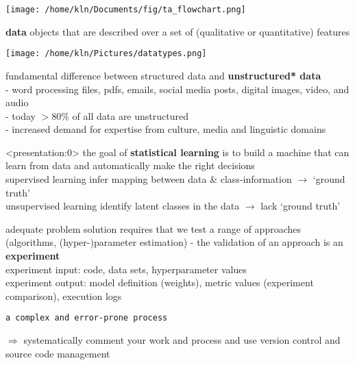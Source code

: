 \documentclass[8pt]{beamer}
\begin{document}
\begin{frame}
	\begin{center}
		\texttt{[image: /home/kln/Documents/fig/ta\_flowchart.png]}
	\end{center}
\end{frame}


\begin{frame}{}
\textbf{data} objects that are described over a set of (qualitative or quantitative) features 
\medskip
	\begin{center}
		\texttt{[image: /home/kln/Pictures/datatypes.png]}
	\end{center}
\medskip
fundamental difference between structured data and \textbf{unstructured* data}\\
\smallskip
- word processing files, pdfs, emails, social media posts, digital images, video, and audio\\
\smallskip
- today $> 80\%$ of all data are unstructured\\
\smallskip
- increased demand for expertise from culture, media and linguistic domains
\end{frame}


\begin{frame}<presentation:0>
the goal of \textbf{statistical learning} is to build a machine that can learn from data and automatically make the right decisions\\
\medskip
supervised learning infer mapping between data \& class-information $\rightarrow$ `ground truth'\\
\medskip
unsupervised learning identify latent classes in the data $\rightarrow$ lack `ground truth'\\
\end{frame}


\begin{frame}
adequate problem solution requires that we test a range of approaches (algorithms, (hyper-)parameter estimation) - the validation of an approach is an \textbf{experiment}\\
\medskip
experiment input: code, data sets, hyperparameter values\\
\medskip
experiment output: model definition (weights), metric values (experiment comparison), execution logs\\
\medskip
	\begin{center}
		\colorbox{red!30}{\texttt{a complex and error-prone process}}
	\end{center}
\medskip
$\Rightarrow$ systematically comment your work and process and use version control and source code management
\end{frame}
\end{document}
